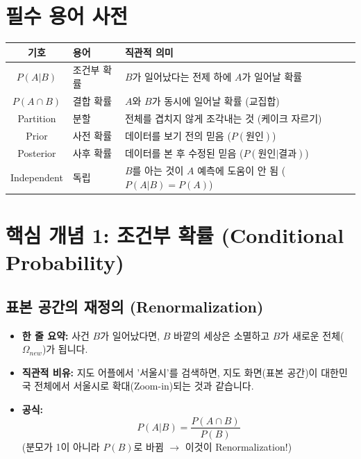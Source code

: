 \documentclass[11pt,a4paper]{book}
\theoremstyle{definition}
\begin{document}
\section{필수 용어 사전}

\begin{center}
\begin{tabular}{|c|l|l|}
\hline
\rowcolor{mainblue!20} \textbf{기호} & \textbf{용어} & \textbf{직관적 의미} \\ \hline
$P(A|B)$ & 조건부 확률 & $B$가 일어났다는 전제 하에 $A$가 일어날 확률 \\ \hline
$P(A \cap B)$ & 결합 확률 & $A$와 $B$가 동시에 일어날 확률 (교집합) \\ \hline
Partition & 분할 & 전체를 겹치지 않게 조각내는 것 (케이크 자르기) \\ \hline
Prior & 사전 확률 & 데이터를 보기 전의 믿음 ($P(\text{원인})$) \\ \hline
Posterior & 사후 확률 & 데이터를 본 후 수정된 믿음 ($P(\text{원인}|\text{결과})$) \\ \hline
Independent & 독립 & $B$를 아는 것이 $A$ 예측에 도움이 안 됨 ($P(A|B)=P(A)$) \\ \hline
\end{tabular}
\end{center}

\section{핵심 개념 1: 조건부 확률 (Conditional Probability)}

\subsection{표본 공간의 재정의 (Renormalization)}
\begin{conceptbox}[title={새로운 정보는 세상을 축소시킨다}]
\begin{itemize}
    \item \textbf{한 줄 요약:} 사건 $B$가 일어났다면, $B$ 바깥의 세상은 소멸하고 $B$가 새로운 전체($\Omega_{new}$)가 됩니다.
    \item \textbf{직관적 비유:} 지도 어플에서 '서울시'를 검색하면, 지도 화면(표본 공간)이 대한민국 전체에서 서울시로 확대(Zoom-in)되는 것과 같습니다.
    \item \textbf{공식:}
    \[ P(A|B) = \frac{P(A \cap B)}{P(B)} \]
    (분모가 1이 아니라 $P(B)$로 바뀜 $\to$ 이것이 Renormalization!)
\end{itemize}
\end{conceptbox}
\end{document}
